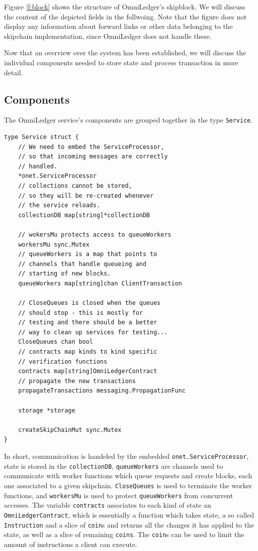 \documentclass[11pt, a4paper, twoside, openright]{article} %
\begin{document}
Figure \ref{f:block} shows the structure of OmniLedger's skipblock. We will
discuss the content of the depicted fields in the follwoing.
Note that the figure does not display any information about forward links or
other data belonging to the skipchain implementation, since OmniLedger does not
handle these.

Now that an overview over the system has been established, we will discuss the
individual components needed to store state and process transaction in more
detail.

\newpage
\subsection{Components}
The OmniLedger service's components are grouped together in the type
\texttt{Service}.

\begin{lstlisting}[caption={The structure of the OmniLedger service.},captionpos=b]
type Service struct {
	// We need to embed the ServiceProcessor,
    // so that incoming messages are correctly
    // handled.
	*onet.ServiceProcessor
	// collections cannot be stored,
    // so they will be re-created whenever 
	// the service reloads.
	collectionDB map[string]*collectionDB

	// wokersMu protects access to queueWorkers
	workersMu sync.Mutex
	// queueWorkers is a map that points to
    // channels that handle queueing and
	// starting of new blocks.
	queueWorkers map[string]chan ClientTransaction

	// CloseQueues is closed when the queues
    // should stop - this is mostly for
	// testing and there should be a better
    // way to clean up services for testing...
	CloseQueues chan bool
	// contracts map kinds to kind specific
    // verification functions
	contracts map[string]OmniLedgerContract
	// propagate the new transactions
	propagateTransactions messaging.PropagationFunc

	storage *storage

	createSkipChainMut sync.Mutex
}
\end{lstlisting}

In short, communication is handeled by the embedded
\texttt{onet.ServiceProcessor}, state is stored in the \texttt{collectionDB},
\texttt{queueWorkers} are channels
used to communicate with worker functions which queue requests and create
blocks, each one associated to a given skipchain. \texttt{CloseQueues} is used
to terminate the worker functions, and \texttt{workersMu} is used to protect 
\texttt{queueWorkers} from concurrent accesses.
The variable \texttt{contracts} associates to each kind of state an
\texttt{OmniLedgerContract}, which is essentially a function which takes state,
a so called \texttt{Instruction} and a slice of \texttt{coin}s and returns
all the changes it has applied to the state, as well as a slice of remaining
\texttt{coins}. The \texttt{coin}s can be used to limit the amount of
instructions a client can execute.
\end{document}
